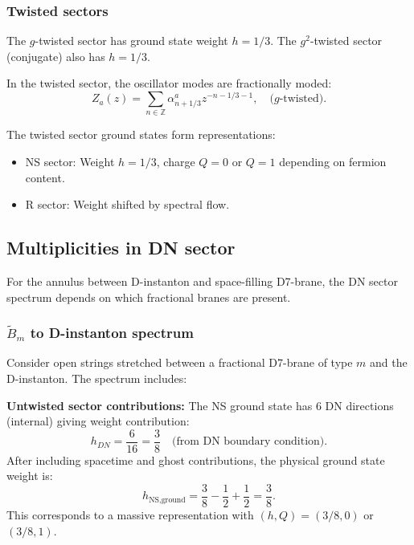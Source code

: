\documentclass[11pt]{article}
\newcommand{\Z}{\mathbb{Z}}
\begin{document}
\subsubsection{Twisted sectors}

The $g$-twisted sector has ground state weight $h = 1/3$. The $g^2$-twisted sector (conjugate) also has $h = 1/3$.

In the twisted sector, the oscillator modes are fractionally moded:
\begin{equation}
Z_a(z) = \sum_{n \in \Z} \alpha^a_{n+1/3} z^{-n-1/3-1}, \quad \text{($g$-twisted)}.
\end{equation}

The twisted sector ground states form representations:
\begin{itemize}
\item NS sector: Weight $h = 1/3$, charge $Q = 0$ or $Q = 1$ depending on fermion content.
\item R sector: Weight shifted by spectral flow.
\end{itemize}

\subsection{Multiplicities in DN sector}

For the annulus between D-instanton and space-filling D7-brane, the DN sector spectrum depends on which fractional branes are present.

\subsubsection{$\tilde{B}_m$ to D-instanton spectrum}

Consider open strings stretched between a fractional D7-brane of type $m$ and the D-instanton. The spectrum includes:

\textbf{Untwisted sector contributions:}
The NS ground state has 6 DN directions (internal) giving weight contribution:
\begin{equation}
h_{DN} = \frac{6}{16} = \frac{3}{8} \quad \text{(from DN boundary condition)}.
\end{equation}
After including spacetime and ghost contributions, the physical ground state weight is:
\begin{equation}
h_{\text{NS,ground}} = \frac{3}{8} - \frac{1}{2} + \frac{1}{2} = \frac{3}{8}.
\end{equation}
This corresponds to a massive representation with $(h, Q) = (3/8, 0)$ or $(3/8, 1)$.
\end{document}

